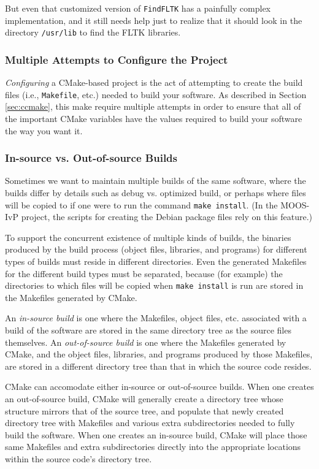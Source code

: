 \documentclass[letterpaper,10pt]{article}
\begin{document}
But even that customized version of \verb|FindFLTK| has a painfully complex
implementation, and it still needs help just to realize that it should look
in the directory \verb|/usr/lib|
to find the FLTK libraries.


\subsubsection{Multiple Attempts to Configure the Project}
\textit{Configuring} a CMake-based project is the act of attempting to create
the build files (i.e., \verb|Makefile|, etc.) needed to build your software.
As described in Section \ref{sec:ccmake}, this make require multiple attempts
in order to ensure that all of the important CMake variables have the values
required to build your software the way you want it.

\subsubsection{In-source vs. Out-of-source Builds}
Sometimes we want to maintain multiple builds of the same software, where the builds
differ by details such as debug vs. optimized build, or perhaps where files will be
copied to if one were to run the command \verb|make install|.  (In the MOOS-IvP
project, the scripts for creating the Debian package files rely on this feature.)

To support the concurrent existence of multiple kinds of builds, the binaries
produced by the build process (object files, libraries, and programs) for different
types of builds must reside in different directories.  Even the generated Makefiles
for the different build types must be separated, because (for example) the directories
to which files will be copied when \verb|make install| is run are stored in the
Makefiles generated by CMake.

An \textit{in-source build} is one where the Makefiles, object files, etc. associated 
with a build of the software are stored in the same directory tree as the source files 
themselves.  An \textit{out-of-source build} is one where the Makefiles generated by
CMake, and the object files, libraries, and programs produced by those Makefiles, are
stored in a different directory tree than that in which the source code resides.

CMake can accomodate either in-source or out-of-source builds.  
When one creates an out-of-source build, CMake will generally create a
directory tree whose structure mirrors that of the source tree, and populate that 
newly created directory tree with Makefiles and various extra subdirectories needed
to fully build the software.  When one creates an in-source build, CMake will place
those same Makefiles and extra subdirectories directly into the appropriate locations
within the source code's directory tree.
\end{document}
